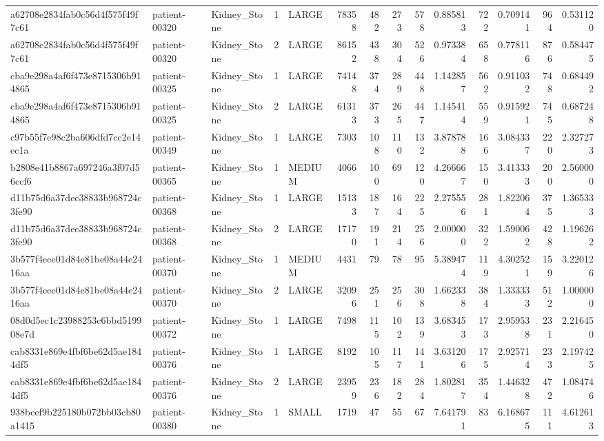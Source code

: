 \begin{tabular}{lllrlrrrrrrrrr}
a62708e2834fab0c56d4f575f49f7c61 & patient-00320 & Kidney_Stone & 1 & LARGE & 78358 & 482 & 273 & 578 & 0.885813 & 722 & 0.709141 & 964 & 0.531120 \\
a62708e2834fab0c56d4f575f49f7c61 & patient-00320 & Kidney_Stone & 2 & LARGE & 86152 & 438 & 304 & 526 & 0.973384 & 658 & 0.778116 & 876 & 0.584475 \\
cba9e298a4af6f473e8715306b914865 & patient-00325 & Kidney_Stone & 1 & LARGE & 74148 & 374 & 289 & 448 & 1.142857 & 562 & 0.911032 & 748 & 0.684492 \\
cba9e298a4af6f473e8715306b914865 & patient-00325 & Kidney_Stone & 2 & LARGE & 61313 & 373 & 265 & 447 & 1.145414 & 559 & 0.915921 & 745 & 0.687248 \\
c97b55f7e98c2ba606dfd7cc2e14ec1a & patient-00349 & Kidney_Stone & 1 & LARGE & 7303 & 108 & 110 & 132 & 3.878788 & 166 & 3.084337 & 220 & 2.327273 \\
b2808e41b8867a697246a3f07d56ccf6 & patient-00365 & Kidney_Stone & 1 & MEDIUM & 4066 & 100 & 69 & 120 & 4.266667 & 150 & 3.413333 & 200 & 2.560000 \\
d11b75d6a37dec38833b968724c3fe90 & patient-00368 & Kidney_Stone & 1 & LARGE & 15133 & 187 & 164 & 225 & 2.275556 & 281 & 1.822064 & 375 & 1.365333 \\
d11b75d6a37dec38833b968724c3fe90 & patient-00368 & Kidney_Stone & 2 & LARGE & 17170 & 191 & 214 & 256 & 2.000000 & 322 & 1.590062 & 428 & 1.196262 \\
3b577f4eee01d84e81be08a44e2416aa & patient-00370 & Kidney_Stone & 1 & MEDIUM & 4431 & 79 & 78 & 95 & 5.389474 & 119 & 4.302521 & 159 & 3.220126 \\
3b577f4eee01d84e81be08a44e2416aa & patient-00370 & Kidney_Stone & 2 & LARGE & 32096 & 251 & 256 & 308 & 1.662338 & 384 & 1.333333 & 512 & 1.000000 \\
08d0d5ec1c23988253c6bbd519908e7d & patient-00372 & Kidney_Stone & 1 & LARGE & 7498 & 115 & 102 & 139 & 3.683453 & 173 & 2.959538 & 231 & 2.216450 \\
cab8331e869e4fbf6be62d5ae1844df5 & patient-00376 & Kidney_Stone & 1 & LARGE & 8192 & 105 & 117 & 141 & 3.631206 & 175 & 2.925714 & 233 & 2.197425 \\
cab8331e869e4fbf6be62d5ae1844df5 & patient-00376 & Kidney_Stone & 2 & LARGE & 23959 & 236 & 182 & 284 & 1.802817 & 354 & 1.446328 & 472 & 1.084746 \\
938beef9b225180b072bb03cb80a1415 & patient-00380 & Kidney_Stone & 1 & SMALL & 1719 & 47 & 55 & 67 & 7.641791 & 83 & 6.168675 & 111 & 4.612613 \\

\end{tabular}
